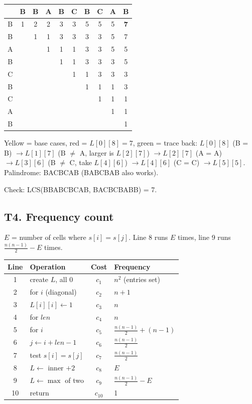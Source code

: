 \documentclass[11pt]{article}
\begin{document}
\begin{center}
\renewcommand{\arraystretch}{1.25}
\begin{tabular}{c|ccccccccc}
 & B & B & A & B & C & B & C & A & B \\ \hline
B & \cellcolor{base}1 & 2 & 2 & 3 & 3 & 5 & 5 & 5 & \cellcolor{ans}\textbf{7} \\
B &   & \cellcolor{base}1 & 1 & 3 & 3 & 3 & 3 & \cellcolor{path}5 & 7 \\
A &   &   & \cellcolor{base}1 & 1 & 1 & 3 & 3 & \cellcolor{path}5 & 5 \\
B &   &   &   & \cellcolor{base}1 & 1 & 3 & \cellcolor{path}3 & 3 & 5 \\
C &   &   &   &   & \cellcolor{base}1 & 1 & \cellcolor{path}3 & 3 & 3 \\
B &   &   &   &   &   & \cellcolor{path}1 & 1 & 1 & 3 \\
C &   &   &   &   &   &   & \cellcolor{base}1 & 1 & 1 \\
A &   &   &   &   &   &   &   & \cellcolor{base}1 & 1 \\
B &   &   &   &   &   &   &   &   & \cellcolor{base}1 \\
\end{tabular}
\end{center}

Yellow = base cases, red = $L[0][8] = 7$, green = trace back: $L[0][8]$ (B = B) $\to L[1][7]$ (B $\neq$ A, larger is $L[2][7]$) $\to L[2][7]$ (A = A) $\to L[3][6]$ (B $\neq$ C, take $L[4][6]$) $\to L[4][6]$ (C = C) $\to L[5][5]$. Palindrome: BACBCAB (BABCBAB also works).

Check: LCS(BBABCBCAB, BACBCBABB) = 7.

\subsection*{T4. Frequency count}

$E$ = number of cells where $s[i] = s[j]$. Line 8 runs $E$ times, line 9 runs $\frac{n(n-1)}{2} - E$ times.

\begin{center}
\begin{tabular}{clcl}
\toprule
Line & Operation & Cost & Frequency \\
\midrule
1 & create $L$, all 0 & $c_1$ & $n^2$ (entries set) \\
2 & for $i$ (diagonal) & $c_2$ & $n+1$ \\
3 & $L[i][i] \gets 1$ & $c_3$ & $n$ \\
4 & for $len$ & $c_4$ & $n$ \\
5 & for $i$ & $c_5$ & $\frac{n(n-1)}{2} + (n-1)$ \\
6 & $j \gets i + len - 1$ & $c_6$ & $\frac{n(n-1)}{2}$ \\
7 & test $s[i] = s[j]$ & $c_7$ & $\frac{n(n-1)}{2}$ \\
8 & $L \gets$ inner $+ 2$ & $c_8$ & $E$ \\
9 & $L \gets \max$ of two & $c_9$ & $\frac{n(n-1)}{2} - E$ \\
10 & return & $c_{10}$ & 1 \\
\bottomrule
\end{tabular}
\end{center}
\end{document}
